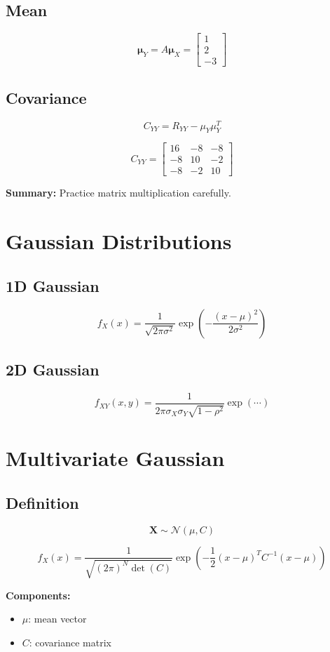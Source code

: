 \documentclass[12pt]{article}
\begin{document}
\subsection{Mean}
\[
\bm{\mu}_Y = A\bm{\mu}_X =
\begin{bmatrix}
1\\2\\-3
\end{bmatrix}
\]

\subsection{Covariance}
\[
C_{YY} = R_{YY} - \mu_Y \mu_Y^T
\]

\[
C_{YY} =
\begin{bmatrix}
16 & -8 & -8\\
-8 & 10 & -2\\
-8 & -2 & 10
\end{bmatrix}
\]

\textbf{Summary:} Practice matrix multiplication carefully.

\section{Gaussian Distributions}
\subsection{1D Gaussian}
\[
f_X(x) = \frac{1}{\sqrt{2\pi\sigma^2}} \exp\left(-\frac{(x-\mu)^2}{2\sigma^2}\right)
\]

\subsection{2D Gaussian}
\[
f_{XY}(x,y) =
\frac{1}{2\pi\sigma_X\sigma_Y\sqrt{1-\rho^2}}
\exp(\cdots)
\]

\section{Multivariate Gaussian}
\subsection{Definition}
\[
\mathbf{X} \sim \mathcal{N}(\mu, C)
\]

\[
f_X(x) =
\frac{1}{\sqrt{(2\pi)^N \det(C)}}
\exp\left(-\frac{1}{2}(x-\mu)^T C^{-1}(x-\mu)\right)
\]

\textbf{Components:}
\begin{itemize}
    \item $\mu$: mean vector
    \item $C$: covariance matrix
\end{itemize}
\end{document}
